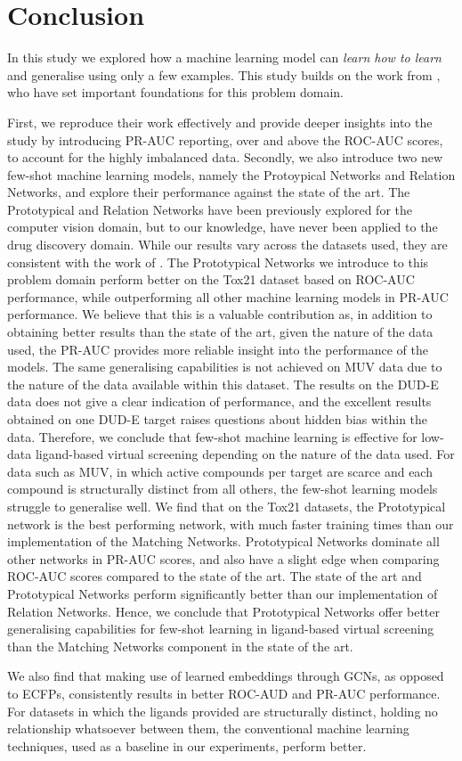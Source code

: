\section{Conclusion}

In this study we explored how a machine learning model can \textit{learn how to learn} and generalise using only a few examples. This study builds on the work from \citet{altae2017low}, who have set important foundations for this problem domain. 

First, we reproduce their work effectively and provide deeper insights into the study by introducing PR-AUC reporting, over and above the ROC-AUC scores, to account for the highly imbalanced data. Secondly, we also introduce two new few-shot machine learning models, namely the Protoypical Networks and Relation Networks, and explore their performance against the state of the art. The Prototypical and Relation Networks have been previously explored for the computer vision domain, but to our knowledge, have never been applied to the drug discovery domain. While our results vary across the datasets used, they are consistent with the work of \citet{altae2017low}. The Prototypical Networks we introduce to this problem domain perform better on the Tox21 dataset based on ROC-AUC performance, while outperforming all other machine learning models in PR-AUC performance. We believe that this is a valuable contribution as, in addition to obtaining better results than the state of the art, given the nature of the data used, the PR-AUC provides more reliable insight into the performance of the models. The same generalising capabilities is not achieved on MUV data due to the nature of the data available within this dataset. The results on the DUD-E data does not give a clear indication of performance, and the excellent results obtained on one DUD-E target raises questions about hidden bias within the data. Therefore, we conclude that few-shot machine learning is effective for low-data ligand-based virtual screening depending on the nature of the data used. For data such as MUV, in which active compounds per target are scarce and each compound is structurally distinct from all others, the few-shot learning models struggle to generalise well. We find that on the Tox21 datasets, the Prototypical network is the best performing network, with much faster training times than our implementation of the Matching Networks. Prototypical Networks dominate all other networks in PR-AUC scores, and also have a slight edge when comparing ROC-AUC scores compared to the state of the art. The state of the art and Prototypical Networks perform significantly better than our implementation of Relation Networks. Hence, we conclude that Prototypical Networks offer better generalising capabilities for few-shot learning in ligand-based virtual screening than the Matching Networks component in the state of the art.

We also find that making use of learned embeddings through GCNs, as opposed to ECFPs, consistently results in better ROC-AUD and PR-AUC performance. For datasets in which the ligands provided are structurally distinct, holding no relationship whatsoever between them, the conventional machine learning techniques, used as a baseline in our experiments, perform better.